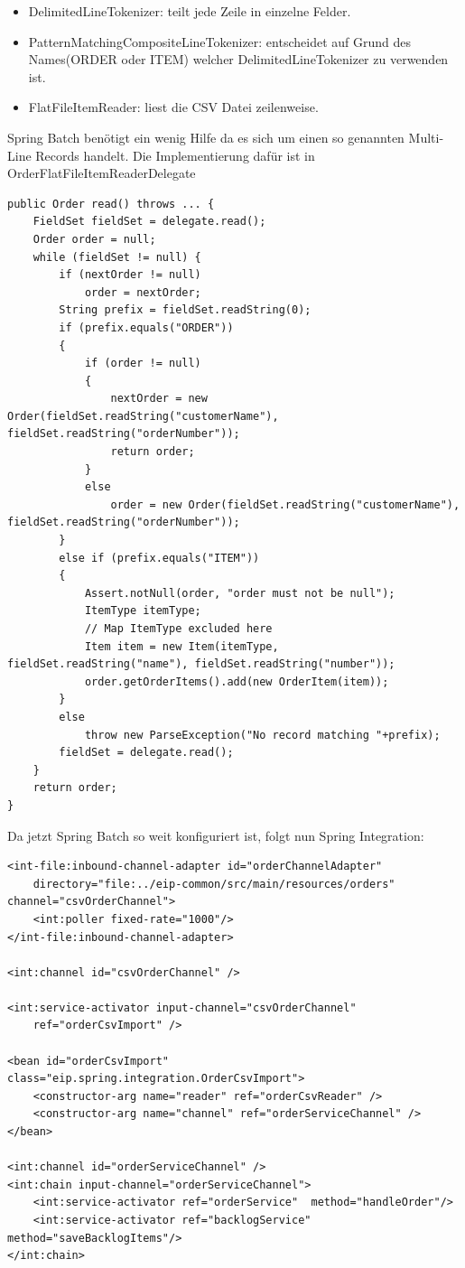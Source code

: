 \documentclass[12pt,a4paper,ngerman]{article}
\begin{document}
\begin{itemize}
\item
  DelimitedLineTokenizer: teilt jede Zeile in einzelne Felder.
\item
  PatternMatchingCompositeLineTokenizer: entscheidet auf Grund des
  Names(ORDER oder ITEM) welcher DelimitedLineTokenizer zu verwenden
  ist.
\item
  FlatFileItemReader: liest die CSV Datei zeilenweise.
\end{itemize}

Spring Batch benötigt ein wenig Hilfe da es sich um einen so genannten
Multi-Line Records handelt. Die Implementierung dafür ist in
OrderFlatFileItemReaderDelegate

\begin{lstlisting}
public Order read() throws ... {
    FieldSet fieldSet = delegate.read();
    Order order = null;
    while (fieldSet != null) {
        if (nextOrder != null)
            order = nextOrder;
        String prefix = fieldSet.readString(0);
        if (prefix.equals("ORDER"))
        {
            if (order != null)
            {
                nextOrder = new Order(fieldSet.readString("customerName"), fieldSet.readString("orderNumber")); 
                return order;
            }
            else
                order = new Order(fieldSet.readString("customerName"), fieldSet.readString("orderNumber"));
        }
        else if (prefix.equals("ITEM"))
        {
            Assert.notNull(order, "order must not be null");
            ItemType itemType;
            // Map ItemType excluded here
            Item item = new Item(itemType, fieldSet.readString("name"), fieldSet.readString("number"));
            order.getOrderItems().add(new OrderItem(item));
        }
        else
            throw new ParseException("No record matching "+prefix);
        fieldSet = delegate.read();
    }
    return order;
}
\end{lstlisting}

Da jetzt Spring Batch so weit konfiguriert ist, folgt nun Spring
Integration:

\begin{lstlisting}
<int-file:inbound-channel-adapter id="orderChannelAdapter"
    directory="file:../eip-common/src/main/resources/orders" channel="csvOrderChannel">
    <int:poller fixed-rate="1000"/>
</int-file:inbound-channel-adapter>

<int:channel id="csvOrderChannel" />

<int:service-activator input-channel="csvOrderChannel"
    ref="orderCsvImport" />

<bean id="orderCsvImport" class="eip.spring.integration.OrderCsvImport">
    <constructor-arg name="reader" ref="orderCsvReader" />
    <constructor-arg name="channel" ref="orderServiceChannel" />
</bean>

<int:channel id="orderServiceChannel" />
<int:chain input-channel="orderServiceChannel">
    <int:service-activator ref="orderService"  method="handleOrder"/>
    <int:service-activator ref="backlogService" method="saveBacklogItems"/>
</int:chain>
\end{lstlisting}
\end{document}
